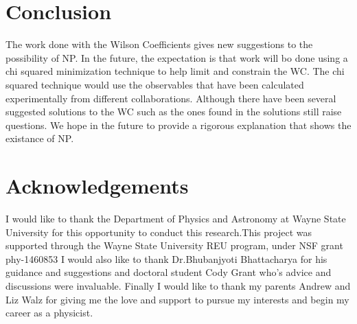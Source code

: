 \documentclass[12pt]{article}
\begin{document}
\section{Conclusion}
The work done with the Wilson Coefficients gives new suggestions to the possibility of NP. In the future, the expectation is that work will bo done using a chi squared minimization technique to help limit and constrain the WC. The chi squared technique would use the observables that have been calculated experimentally from different collaborations. Although there have been several suggested solutions to the WC such as the ones found in \cite{Descotes-Genon:2015uva} the solutions still raise questions. We hope in the future to provide a rigorous explanation that shows the existance of NP.  
\section{Acknowledgements}
I would like to thank the Department of Physics and Astronomy at Wayne State University for this opportunity to conduct this research.This project was supported through the Wayne State University REU program, under NSF grant phy-1460853 I would also like to thank Dr.Bhubanjyoti Bhattacharya for his guidance and suggestions and doctoral student Cody Grant who's advice and discussions were invaluable. Finally I would like to thank my parents Andrew and Liz Walz for giving me the love and support to pursue my interests and begin my career as a physicist.  
\newpage
\end{document}
